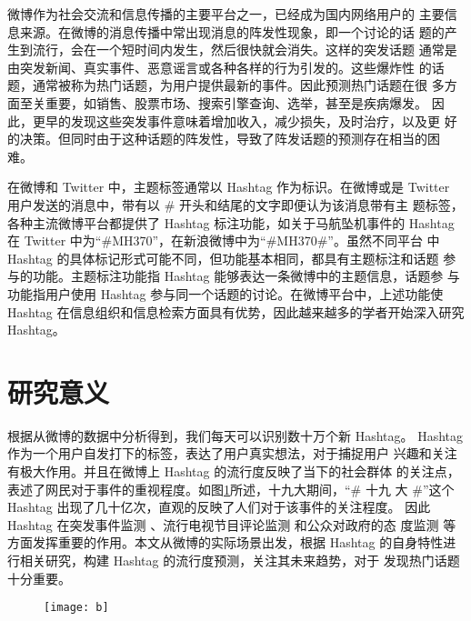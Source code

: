 微博作为社会交流和信息传播的主要平台之一，已经成为国内网络用户的 主要信息来源。在微博的消息传播中常出现消息的阵发性现象，即一个讨论的话 题的产生到流行，会在一个短时间内发生，然后很快就会消失。这样的突发话题 通常是由突发新闻、真实事件、恶意谣言或各种各样的行为引发的。这些爆炸性 的话题，通常被称为热门话题，为用户提供最新的事件。因此预测热门话题在很 多方面至关重要，如销售、股票市场、搜索引擎查询、选举，甚至是疾病爆发。 因此，更早的发现这些突发事件意味着增加收入，减少损失，及时治疗，以及更 好的决策。但同时由于这种话题的阵发性，导致了阵发话题的预测存在相当的困 难。

在微博和 Twitter 中，主题标签通常以 Hashtag 作为标识\citep{shaojian2}。在微博或是 Twitter 用户发送的消息中，带有以 \# 开头和结尾的文字即便认为该消息带有主 题标签，各种主流微博平台都提供了 Hashtag 标注功能，如关于马航坠机事件的 Hashtag 在 Twitter 中为“\#MH370”，在新浪微博中为“\#MH370\#”。虽然不同平台 中 Hashtag 的具体标记形式可能不同，但功能基本相同，都具有主题标注和话题 参与的功能。主题标注功能指 Hashtag 能够表达一条微博中的主题信息，话题参 与功能指用户使用 Hashtag 参与同一个话题的讨论。在微博平台中，上述功能使Hashtag 在信息组织和信息检索方面具有优势，因此越来越多的学者开始深入研究 Hashtag。


\section{研究意义}

根据从微博的数据中分析得到，我们每天可以识别数十万个新 Hashtag。 Hashtag 作为一个用户自发打下的标签，表达了用户真实想法，对于捕捉用户 兴趣和关注有极大作用。并且在微博上 Hashtag 的流行度反映了当下的社会群体 的关注点，表述了网民对于事件的重视程度。如图\ref{fig:b}所述，十九大期间，“\# 十九 大 \#”这个 Hashtag 出现了几十亿次，直观的反映了人们对于该事件的关注程度。 因此 Hashtag 在突发事件监测 \citep{Hughes2009Twitter}、流行电视节目评论监测 \citep{Deller2011Twittering} 和公众对政府的态 度监测 \citep{small2011hashtag}等方面发挥重要的作用。本文从微博的实际场景出发，根据 Hashtag 的自身特性进行相关研究，构建 Hashtag 的流行度预测，关注其未来趋势，对于 发现热门话题十分重要。

\begin{figure}[!htbp]
    \centering
    \texttt{[image: b]}
    \label{fig:b}
\end{figure}

